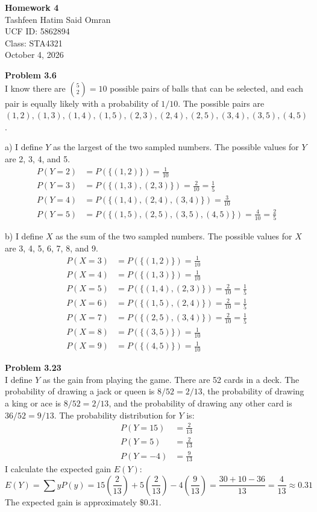 \documentclass[12pt]{article}
\begin{document}
\begin{center}
\textbf{\Large Homework 4} \\
Tashfeen Hatim Said Omran \\
UCF ID: 5862894 \\
Class: STA4321 \\
October 4, 2026
\end{center}

\textbf{Problem 3.6} \\
I know there are $\binom{5}{2} = 10$ possible pairs of balls that can be selected, and each pair is equally likely with a probability of $1/10$. The possible pairs are $(1,2), (1,3), (1,4), (1,5), (2,3), (2,4), (2,5), (3,4), (3,5), (4,5)$.

a) I define $Y$ as the largest of the two sampled numbers. The possible values for $Y$ are 2, 3, 4, and 5.
\begin{align*}
P(Y = 2) &= P(\{(1,2)\}) = \frac{1}{10} \\
P(Y = 3) &= P(\{(1,3), (2,3)\}) = \frac{2}{10} = \frac{1}{5} \\
P(Y = 4) &= P(\{(1,4), (2,4), (3,4)\}) = \frac{3}{10} \\
P(Y = 5) &= P(\{(1,5), (2,5), (3,5), (4,5)\}) = \frac{4}{10} = \frac{2}{5}
\end{align*}

b) I define $X$ as the sum of the two sampled numbers. The possible values for $X$ are 3, 4, 5, 6, 7, 8, and 9.
\begin{align*}
P(X = 3) &= P(\{(1,2)\}) = \frac{1}{10} \\
P(X = 4) &= P(\{(1,3)\}) = \frac{1}{10} \\
P(X = 5) &= P(\{(1,4), (2,3)\}) = \frac{2}{10} = \frac{1}{5} \\
P(X = 6) &= P(\{(1,5), (2,4)\}) = \frac{2}{10} = \frac{1}{5} \\
P(X = 7) &= P(\{(2,5), (3,4)\}) = \frac{2}{10} = \frac{1}{5} \\
P(X = 8) &= P(\{(3,5)\}) = \frac{1}{10} \\
P(X = 9) &= P(\{(4,5)\}) = \frac{1}{10}
\end{align*}

\textbf{Problem 3.23} \\
I define $Y$ as the gain from playing the game. There are 52 cards in a deck. The probability of drawing a jack or queen is $8/52 = 2/13$, the probability of drawing a king or ace is $8/52 = 2/13$, and the probability of drawing any other card is $36/52 = 9/13$. The probability distribution for $Y$ is:
\begin{align*}
P(Y = 15) &= \frac{2}{13} \\
P(Y = 5) &= \frac{2}{13} \\
P(Y = -4) &= \frac{9}{13}
\end{align*}
I calculate the expected gain $E(Y)$:
\[ E(Y) = \sum y P(y) = 15\left(\frac{2}{13}\right) + 5\left(\frac{2}{13}\right) - 4\left(\frac{9}{13}\right) = \frac{30 + 10 - 36}{13} = \frac{4}{13} \approx 0.31 \]
The expected gain is approximately $\$0.31$.
\end{document}
